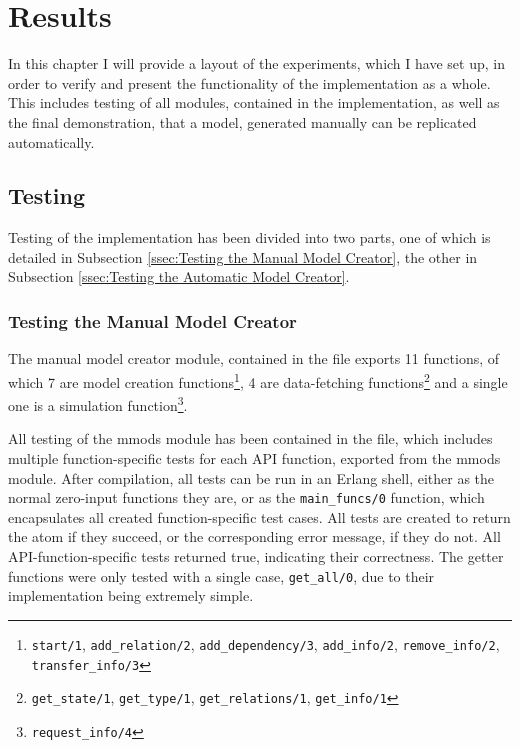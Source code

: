 \chapter{Results}

In this chapter I will provide a layout of the experiments, which I have set up, in order to verify and present the functionality of the implementation as a whole. This includes testing of all modules, contained in the implementation, as well as the final demonstration, that a model, generated manually can be replicated automatically.

\section{Testing}

Testing of the implementation has been divided into two parts, one of which is detailed in Subsection \ref{ssec:Testing the Manual Model Creator}, the other in Subsection \ref{ssec:Testing the Automatic Model Creator}.

\subsection{Testing the Manual Model Creator}
The manual model creator module, contained in the file  exports 11 functions, of which 7 are model creation functions\footnote{\lstinline{start/1}, \lstinline{add_relation/2}, \lstinline{add_dependency/3}, \lstinline{add_info/2}, \lstinline{remove_info/2}, \lstinline{transfer_info/3}}, 4 are data-fetching functions\footnote{\lstinline{get_state/1}, \lstinline{get_type/1}, \lstinline{get_relations/1}, \lstinline{get_info/1}} and a single one is a simulation function\footnote{\lstinline{request_info/4}}.

All testing of the mmods module has been contained in the  file, which includes multiple function-specific tests for each API function, exported from the mmods module. After compilation, all tests can be run in an Erlang shell, either as the normal zero-input functions they are, or as the \linebreak \lstinline{main_funcs/0} function, which encapsulates all created function-specific test cases. All tests are created to return the atom  if they succeed, or the corresponding error message, if they do not. All API-function-specific tests returned true, indicating their correctness. The getter functions were only tested with a single case, \lstinline{get_all/0}, due to their implementation being extremely simple.

